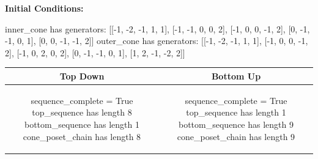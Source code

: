 \documentclass[10pt]{article}
\begin{document}
\textbf{Initial Conditions:}
\begin{SAGE}
inner_cone has generators: 
[[-1, -2, -1, 1, 1], [-1, -1, 0, 0, 2], [-1, 0, 0, -1, 2], [0, -1, -1, 0, 1], [0, 0, -1, -1, 2]]
outer_cone has generators: 
[[-1, -2, -1, 1, 1], [-1, 0, 0, -1, 2], [-1, 0, 2, 0, 2], [0, -1, -1, 0, 1], [1, 2, -1, -2, 2]]

\end{SAGE}
\begin{tabular}{c|c}
\textbf{Top Down} & \textbf{Bottom Up} \\ \hline  
\begin{SAGE}
sequence_complete = True
top_sequence has length 8
bottom_sequence has length 1
cone_poset_chain has length 8
\end{SAGE} 
&
\begin{SAGE}
sequence_complete = True
top_sequence has length 1
bottom_sequence has length 9
cone_poset_chain has length 9
\end{SAGE} 
\\ \hline


\end{tabular}
\end{document}
